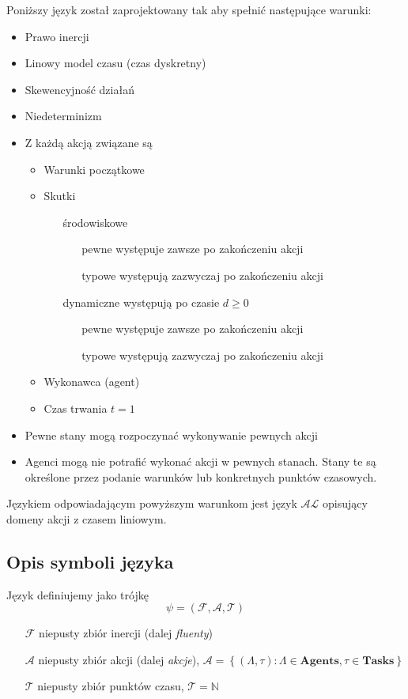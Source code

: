 Poniższy język został zaprojektowany tak aby spełnić następujące warunki:
\begin{itemize}
	\item Prawo inercji
	\item Linowy model czasu (czas dyskretny)
	\item Skewencyjność działań
	\item Niedeterminizm
	\item Z każdą akcją związane są
		\begin{itemize}
			\item Warunki początkowe
			\item Skutki
				\begin{itemize}
					\item[środowiskowe] 
						\begin{itemize}
							\item[pewne] występuje zawsze po zakończeniu akcji
							\item[typowe] występują zazwyczaj po zakończeniu akcji
						\end{itemize}
					\item[dynamiczne] występują po czasie $d \geqslant 0$
						\begin{itemize}
							\item[pewne] występuje zawsze po zakończeniu akcji
							\item[typowe] występują zazwyczaj po zakończeniu akcji
						\end{itemize}
				\end{itemize}
			\item Wykonawca (agent)
			\item Czas trwania $t = 1$
		\end{itemize}	
	\item Pewne stany mogą rozpoczynać wykonywanie pewnych akcji
	\item Agenci mogą nie potrafić wykonać akcji w pewnych stanach. Stany te są określone przez podanie
	warunków lub konkretnych punktów czasowych.	
\end{itemize}
Językiem odpowiadającym powyższym warunkom jest język $\mathcal{AL}$ 
opisujący domeny akcji z czasem liniowym.

\subsection{Opis symboli języka}
\begin{definition}
Język definiujemy jako trójkę
\begin{equation}
\psi = \left( \mathcal{F}, \mathcal{A}, \mathcal{T} \right)
\end{equation}
\begin{itemize}
\item[$\mathcal{F}$] niepusty zbiór inercji (dalej \emph{fluenty})
\item[$\mathcal{A}$] niepusty zbiór akcji (dalej \emph{akcje}), 
$\mathcal{A} = \left\lbrace (\Lambda, \tau) : \Lambda \in \textbf{Agents}, \tau \in \textbf{Tasks} \right\rbrace$
\item[$\mathcal{T}$] niepusty zbiór punktów czasu, $\mathcal{T} = \mathbb{N}$
\end{itemize}
\end{definition}

